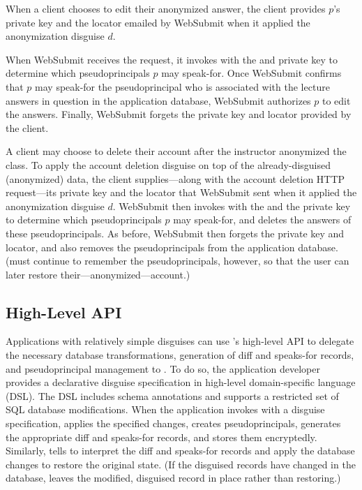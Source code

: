 %
When a client chooses to edit their anonymized answer, the client provides $p$'s
private key and the locator  emailed by WebSubmit when it applied
the anonymization disguise $d$.

When WebSubmit receives the request, it invokes  with the
 and private key to determine which pseudoprincipals $p$ may speak-for.
%
Once WebSubmit confirms that $p$ may speak-for the pseudoprincipal who is
associated with the lecture answers in question in the application database,
WebSubmit authorizes $p$ to edit the answers.
%
Finally, WebSubmit forgets the private key and locator provided by the client.
%

%
A client may choose to delete their account after the instructor anonymized the
class.
%
To apply the account deletion disguise on top of the already-disguised (anonymized)
data, the client supplies---along with the account deletion HTTP request---its
private key and the locator  that WebSubmit sent when it applied the
anonymization disguise $d$.
%
WebSubmit then invokes  with the  and the private
key to determine which pseudoprincipals $p$ may speak-for, and deletes the answers
of these pseudoprincipals.
%
As before, WebSubmit then forgets the private key and locator, and also removes
the pseudoprincipals from the application database.
%
(\sys must continue to remember the pseudoprincipals, however, so that the user
can later restore their---anonymized---account.)
%

\subsection{High-Level API}
\label{s:api-high}

%
Applications with relatively simple disguises can use \sys's high-level API to
delegate the necessary database transformations, generation of diff and speaks-for
records, and pseudoprincipal management to \sys.
%
To do so, the application developer provides a declarative disguise specification in
\sys high-level domain-specific language (DSL).
%
The DSL includes schema annotations and supports a restricted set of SQL database
modifications.
%
When the application invokes  with a disguise specification, \sys
applies the specified changes, creates pseudoprincipals, generates the appropriate
diff and speaks-for records, and stores them encryptedly.
%
Similarly,  tells \sys to interpret the diff and speaks-for
records and apply the database changes to restore the original state.
%
(If the disguised records have changed in the database, \sys leaves the modified,
disguised record in place rather than restoring.)
%

